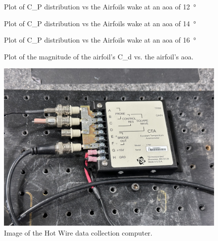 \begin{figure}[htpb]
    \centering
    
    \caption[plot of the coefficient of pressure vs the angle of attack at Twelve degrees.]{Plot of \gls{C_P} distribution vs the Airfoils wake at an \acrshort{aoa} of \qty{12} {\degree}}
    \label{fig:C_p Distribution of Airfoil Wake at 12° AOA.svg}
\end{figure}

\begin{figure}[htpb]
    \centering
    
    \caption[plot of the coefficient of pressure vs the angle of attack at fourteen degrees.]{Plot of \gls{C_P} distribution vs the Airfoils wake at an \acrshort{aoa} of \qty{14} {\degree}}
    \label{fig:C_p Distribution of Airfoil Wake at 14° AOA.svg}
\end{figure}

\begin{figure}[htpb]
    \centering
    
    \caption[plot of the coefficient of pressure vs the angle of attack at sixteen degrees.]{Plot of \gls{C_P} distribution vs the Airfoils wake at an \acrshort{aoa} of \qty{16} {\degree}}
    \label{fig:C_p Distribution of Airfoil Wake at 16° AOA.svg}
\end{figure}

\begin{figure}[htpb]
    \centering
    
    \caption[Plot of the magnitude of the coefficient of drag versus the angle of attack of an airfoil.]{Plot of the magnitude of the airfoil's \gls{C_d} vs. the airfoil's \acrshort{aoa}.}
    \label{fig:C_d_magnitude}
\end{figure}

\begin{figure}[htpb]
    \centering
    \includegraphics[width=0.75\linewidth]{Figures/IMG_3193.jpeg}
    \caption[Image of the Hot Wire data collection computer.]{Image of the Hot Wire data collection computer.}
    \label{fig: HotWireAndPitotComputer}
\end{figure}

